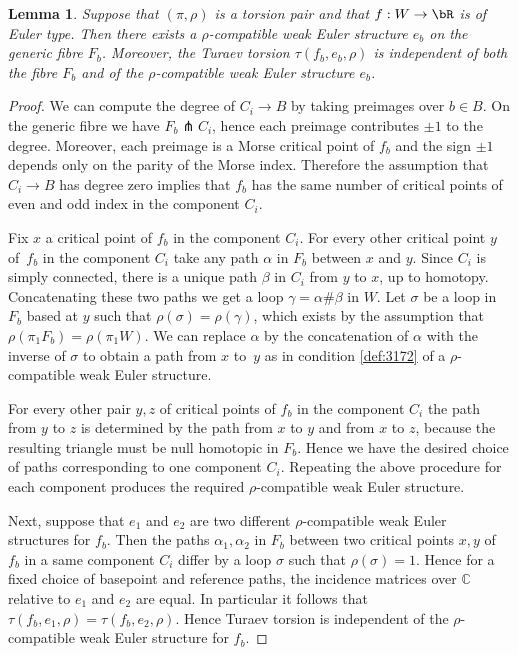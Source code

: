 \documentclass[JEP,XML,SOM,Unicode,NoFloatCountersInSection]{cedram}
\theoremstyle{plain}
\newtheorem{lemma}[theorem]{Lemma}
\theoremstyle{definition}
\newcommand{\bC}{\mathbb{C}}\newcommand{\bD}{\mathbb{D}}
\begin{document}
\begin{lemma}\label{familyturaev}
Suppose that $(\pi, \rho)$ is a torsion pair and that $f:W \to \bR$ is of Euler type. Then there exists a $\rho$-compatible weak Euler structure $e_b$ on the generic fibre $F_b$. Moreover, the Turaev torsion $\tau(f_b,e_b, \rho)$ is independent of both the fibre $F_b$ and of the $\rho$-compatible weak Euler structure $e_b$.
\end{lemma}

\begin{proof} We can compute the degree of $C_i \to B$ by taking preimages over $b \in B$. On the generic fibre we have $F_b \pitchfork C_i$, hence each preimage contributes $\pm 1$ to the degree. Moreover, each preimage is a Morse critical point of $f_b$ and the sign $\pm 1$ depends only on the parity of the Morse index. Therefore the assumption that $C_i \to B$ has degree zero implies that $f_b$ has the same number of critical points of even and odd index in the component $C_i$.

Fix $x$ a critical point of $f_b$ in the component $C_i$. For every other critical point $y$ of~$f_b$ in the component $C_i$ take any path $\alpha$ in $F_b$ between $x$ and $y$. Since $C_i$ is simply connected, there is a unique path $\beta$ in $C_i$ from $y$ to $x$, up to homotopy. Concatenating these two paths we get a loop $\gamma = \alpha \# \beta$ in $W$. Let $\sigma$ be a loop in $F_b$ based at $y$ such that $\rho(\sigma)=\rho(\gamma)$, which exists by the assumption that $\rho(\pi_1F_b)=\rho(\pi_1W)$. We can replace $\alpha$ by the concatenation of $\alpha$ with the inverse of $\sigma$ to obtain a path from $x$ to~$y$ as in condition \eqref{def:3172} of a $\rho$-compatible weak Euler structure.

For every other pair $y,z$ of critical points of $f_b$ in the component $C_i$ the path from $y$ to $z$ is determined by the path from $x$ to $y$ and from $x$ to $z$, because the resulting triangle must be null homotopic in $F_b$. Hence we have the desired choice of paths corresponding to one component $C_i$. Repeating the above procedure for each component produces the required $\rho$-compatible weak Euler structure.

Next, suppose that $e_1$ and $e_2$ are two different $\rho$-compatible weak Euler structures for $f_b$. Then the paths $\alpha_1, \alpha_2$ in $F_b$ between two critical points $x,y$ of $f_b$ in a same component $C_i$ differ by a loop $\sigma$ such that $\rho(\sigma)=1$. Hence for a fixed choice of basepoint and reference paths, the incidence matrices over $\bC$ relative to $e_1$ and $e_2$ are equal. In particular it follows that $\tau(f_b,e_1,\rho)=\tau(f_b, e_2, \rho)$. Hence Turaev torsion is independent of the $\rho$-compatible weak Euler structure for $f_b$.


\end{proof}
\end{document}
